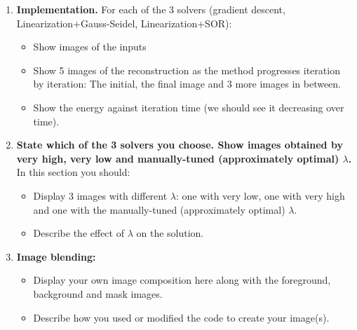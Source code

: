 \documentclass{paper}
\begin{document}
\begin{enumerate}
\item \textbf{Implementation.} For each of the 3 solvers (gradient descent, Linearization+Gauss-Seidel, Linearization+SOR):

\begin{itemize}
\item Show images of the inputs
\item Show 5 images of the reconstruction as the method progresses iteration by iteration: The initial, the final image and 3 more images in between.
\item Show the energy against iteration time (we should see it decreasing over time).
\end{itemize}

\item \textbf{State which of the 3 solvers you choose. Show images obtained by very high, very low and manually-tuned (approximately optimal) $\lambda$.} In this section you should:

\begin{itemize}
\item Display 3 images with different $\lambda$: one with very low, one with very high and one with the manually-tuned (approximately optimal) $\lambda$.
\item Describe the effect of $\lambda$ on the solution.
\end{itemize}

\item \textbf{Image blending:} 
\begin{itemize}
\item Display your own image composition here along with the foreground, background and mask images.
\item Describe how you used or modified the code to create your image(s).
\end{itemize}


\end{enumerate}


 
\end{document}
